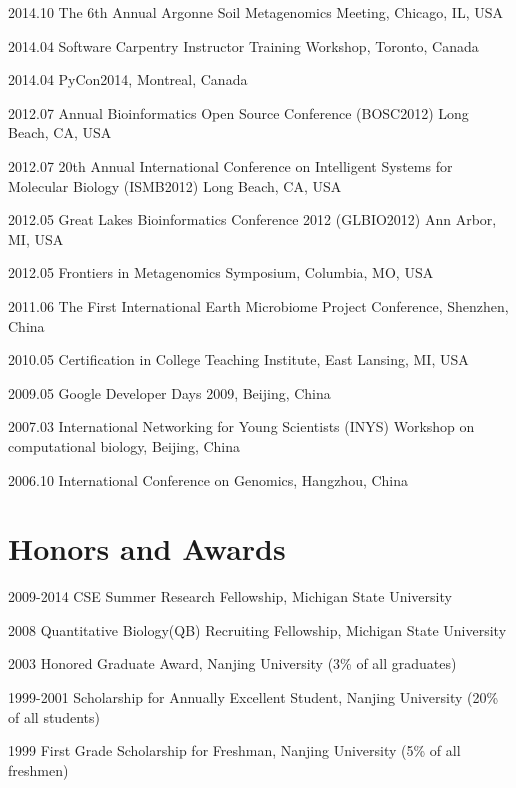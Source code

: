 \documentclass[margin,line]{res}
\newenvironment{list1}{
  \begin{list}{\ding{113}}{%
      \setlength{\itemsep}{0in}
      \setlength{\parsep}{0in} \setlength{\parskip}{0in}
      \setlength{\topsep}{0in} \setlength{\partopsep}{0in} 
      \setlength{\leftmargin}{0.17in}}}{\end{list}}
\begin{document}
\begin{resume}
\begin{list1}
\begin{list1}
\vspace*{.05in}
\item[]  2014.10 The 6th Annual Argonne Soil Metagenomics Meeting, Chicago, IL, USA
\item[]  2014.04 Software Carpentry Instructor Training Workshop, Toronto, Canada
\item[]  2014.04 PyCon2014, Montreal, Canada
\item[]  2012.07 Annual Bioinformatics Open Source Conference (BOSC2012) Long Beach, CA, USA
\item[]  2012.07 20th Annual International Conference on Intelligent Systems for Molecular Biology (ISMB2012) Long Beach, CA, USA
\item[]  2012.05 Great Lakes Bioinformatics Conference 2012 (GLBIO2012) Ann Arbor, MI, USA
\item[]  2012.05 Frontiers in Metagenomics Symposium, Columbia, MO, USA
\item[]  2011.06 The First International Earth Microbiome Project Conference, Shenzhen, China
\item[]  2010.05 Certification in College Teaching Institute, East Lansing, MI, USA
\item[]  2009.05 Google Developer Days 2009, Beijing, China
\item[]  2007.03 International Networking for Young Scientists (INYS) Workshop on computational biology, Beijing, China 
\item[]  2006.10 International Conference on Genomics, Hangzhou, China

\end{list1}
\end{list1}


\section{\sc Honors and Awards} 

\begin{list1}

\item[] 2009-2014 CSE Summer Research Fellowship, Michigan State University
\item[] 2008 Quantitative Biology(QB) Recruiting Fellowship, Michigan State University
\item[] 2003 Honored Graduate Award, Nanjing University (3\% of all graduates) 
\item[] 1999-2001 Scholarship for Annually Excellent Student, Nanjing University (20\% of all students) 
\item[] 1999 First Grade Scholarship for Freshman, Nanjing University (5\% of all freshmen)


\end{list1}
\end{resume}
\end{document}
